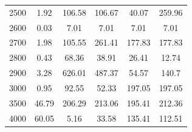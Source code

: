 \begin{table}[htbp]
\begin{center}
\begin{tabular}{lccccc}
            2500 & 1.92 & 106.58 & 106.67 & 40.07 & 259.96 \\
            2600 & 0.03 & 7.01 & 7.01 & 7.01 & 7.01 \\
            2700 & 1.98 & 105.55 & 261.41 & 177.83 & 177.83 \\
            2800 & 0.43 & 68.36 & 38.91 & 26.41 & 12.74 \\
            2900 & 3.28 & 626.01 & 487.37 & 54.57 & 140.7 \\
            3000 & 0.95 & 92.55 & 52.33 & 197.05 & 197.05 \\
            3500 & 46.79 & 206.29 & 213.06 & 195.41 & 212.36 \\
            4000 & 60.05 & 5.16 & 33.58 & 135.41 & 112.51 \\ \hline\hline
        \end{tabular}
        \label{tab:gesystbkg}
    \end{center}
\end{table}

